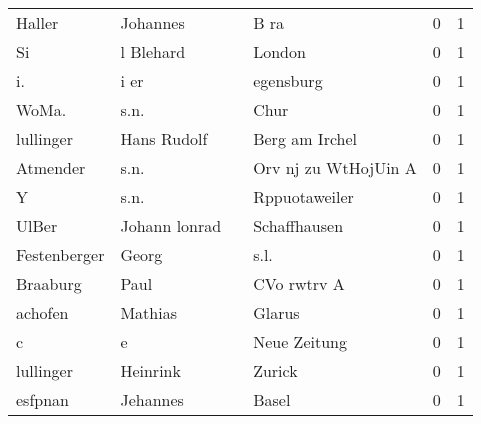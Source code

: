 \documentclass[10pt,a4paper,landscape]{article}
\begin{document}
\begin{longtable}{llllrr}
                   Haller &                           Johannes &             &                                        B ra &          0 &         1 \\
                       Si &                          l Blehard &             &                                      London &          0 &         1 \\
                       i. &                               i er &             &                                   egensburg &          0 &         1 \\
                    WoMa. &                               s.n. &             &                                        Chur &          0 &         1 \\
                lullinger &                        Hans Rudolf &             &                              Berg am Irchel &          0 &         1 \\
                 Atmender &                               s.n. &             &                        Orv nj zu WtHojUin A &          0 &         1 \\
                        Y &                               s.n. &             &                               Rppuotaweiler &          0 &         1 \\
                    UlBer &                      Johann lonrad &             &                                Schaffhausen &          0 &         1 \\
             Festenberger &                              Georg &             &                                        s.l. &          0 &         1 \\
                 Braaburg &                               Paul &             &                                 CVo rwtrv A &          0 &         1 \\
                  achofen &                            Mathias &             &                                      Glarus &          0 &         1 \\
                        c &                                  e &             &                                Neue Zeitung &          0 &         1 \\
                lullinger &                           Heinrink &             &                                      Zurick &          0 &         1 \\
                  esfpnan &                           Jehannes &             &                                       Basel &          0 &         1 \\

\end{longtable}
\end{document}
